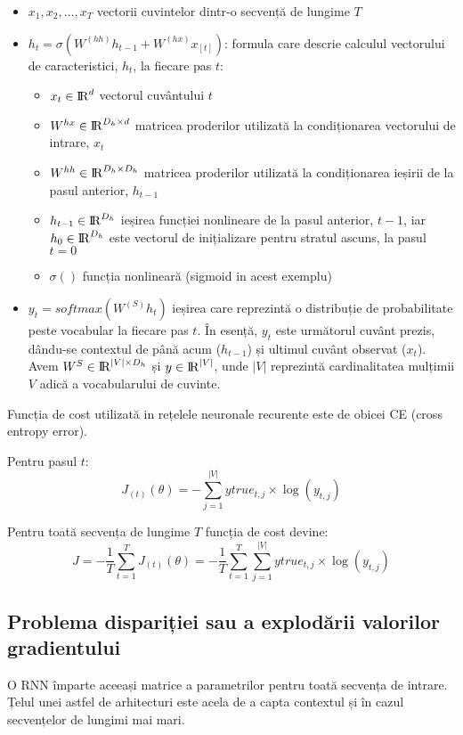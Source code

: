 \begin{itemize}
	\item $x_1, x_2, ..., x_T$ vectorii cuvintelor dintr-o secvență de lungime $T$
	\item $h_t = \sigma{(W^{(hh)} h_{t-1} + W^{(hx)} x_{[t]})}$: formula care descrie calculul vectorului de caracteristici, $h_t$, la fiecare pas $t$:
	
	\begin{itemize}
		\item $ x_t \in {\rm I\!R}^d $ vectorul cuvântului $t$
		\item $ W^{hx} \in {\rm I\!R}^{D_h \times d} $ matricea proderilor utilizată la condiționarea vectorului de intrare, $x_t$
		\item $ W^{hh} \in {\rm I\!R}^{D_h \times D_h} $ matricea proderilor utilizată la condiționarea ieșirii de la pasul anterior, $h_{t-1}$
		\item $ h_{t-1} \in  {\rm I\!R}^{D_h} $ ieșirea funcției nonlineare de la pasul anterior, $t-1$, iar $h_0 \in  {\rm I\!R}^{D_h}$ este vectorul de inițializare pentru stratul ascuns, la pasul $t=0$
		\item $ \sigma() $ funcția nonlineară  (sigmoid in acest exemplu)
	\end{itemize}

	\item $ y_t = softmax(W^{(S)} h_t) $ ieșirea care reprezintă o distribuție de probabilitate peste vocabular la fiecare pas $t$. În esență, $y_t$ este următorul cuvânt prezis, dându-se contextul de până  acum ($ h_{t-1} $) și ultimul cuvânt observat ($x_t$). Avem  $ W^{S} \in {\rm I\!R}^{|V| \times D_h} $ și $ y \in {\rm I\!R}^{|V|} $, unde $|V|$ reprezintă cardinalitatea mulțimii $V$ adică a vocabularului de cuvinte.

\end{itemize}

Funcția de cost utilizată in rețelele neuronale recurente este de obicei CE (cross entropy error).

Pentru pasul $t$:
$$
J_{(t)}(\theta) = - \sum_{j=1}^{|V|}  ytrue_{t, j} \times \log(y_{t, j})
$$

Pentru toată secvența de lungime $T$ funcția de cost devine:
$$
J = - \frac{1}{T} \sum_{t=1}^{T} J_{(t)}(\theta) = - \frac{1}{T} \sum_{t=1}^{T}  \sum_{j=1}^{|V|}  ytrue_{t, j} \times \log(y_{t, j})
$$

\cite{cs224d_notes}


\subsection{Problema dispariției sau a explodării valorilor gradientului}
O RNN împarte aceeași matrice a parametrilor pentru toată secvența de intrare. Țelul unei astfel de arhitecturi este acela de a capta contextul și în cazul secvențelor de lungimi mai mari.

